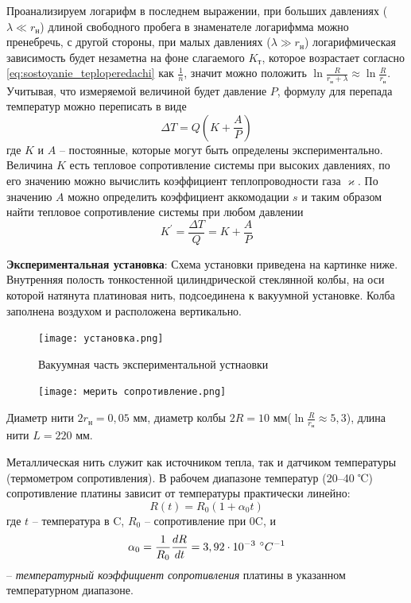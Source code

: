 \documentclass[a4paper,12pt]{article}
\begin{document}
Проанализируем логарифм в последнем выражении, при больших давлениях ($\lambda \ll r_н$) длиной свободного пробега в знаменателе логарифмма можно пренебречь, с другой стороны, при малых давлениях ($\lambda \gg r_н$) логарифмическая зависимость будет незаметна на фоне слагаемого $K_т$, которое возрастает согласно \eqref{eq:sostoyanie_teploperedachi} как $\frac{1}{n}$, значит можно положить $\ln{\frac{R}{r_н + \lambda}} \approx \ln{\frac{R}{r_н}}$. Учитывая, что измеряемой величиной будет давление $P$, формулу для перепада температур можно переписать в виде 
\[\Delta T = Q (K + \frac{A}{P})\]
где $K$ и $A$ -- постоянные, которые могут быть определены экспериментально. Величина $K$ есть тепловое сопротивление системы при высоких давлениях, по его значению можно вычислить коэффициент теплопроводности газа $\varkappa$. По значению $A$ можно определить коэффициент аккомодации $s$ и таким образом найти тепловое сопротивление системы при любом давлении
\[K^{'} = \frac{\Delta T}{Q} = K + \frac{A}{P}\]

\textbf{Экспериментальная установка}: Схема установки приведена на картинке ниже. Внутренняя полость тонкостенной цилиндрической стеклянной колбы, на оси которой натянута платиновая нить, подсоединена к вакуумной установке. Колба заполнена воздухом и расположена вертикально.
\begin{figure}[H]
    \label{fig:ustanovka}
    \centering
    \texttt{[image: установка.png]}
    \caption{Вакуумная часть экспериментальной устнаовки}
\end{figure}

\begin{figure}
    \begin{flushright}
        \vspace{-45pt}
        \texttt{[image: мерить сопротивление.png]}
    \end{flushright}
\end{figure}

Диаметр нити $2r_н = 0,05$ мм, диаметр колбы $2R = 10$ мм($\ln{\frac{R}{r_н}}\approx 5,3$), длина нити $L = 220$ мм.

Металлическая нить служит как источником тепла, так и датчиком температуры (термометром сопротивления). В рабочем диапазоне температур (20–40 ℃) сопротивление платины зависит от температуры практически линейно:
\[R(t) = R_0(1 + \alpha_0t)\]
где $t$ -- температура в \degree C, $R_0$ -- сопротивление при 0\degree C, и 
\[\alpha_0 = \frac{1}{R_0}\frac{dR}{dt} = 3,92\cdot 10^{-3} \text{ }\degree C^{-1}\] -- \textit{температурный коэффициент сопротивления} платины в указанном температурном диапазоне.
\end{document}
